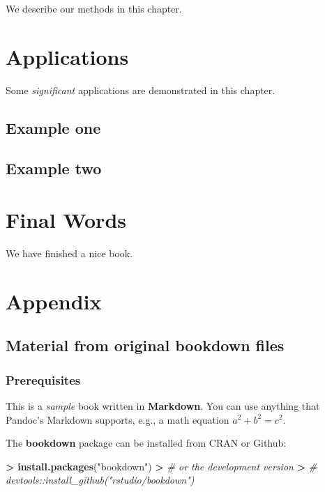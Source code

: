 \documentclass[]{book}
\newenvironment{Shaded}{\begin{snugshade}}{\end{snugshade}}
\newcommand{\KeywordTok}[1]{\textcolor[rgb]{0.13,0.29,0.53}{\textbf{#1}}}
\newcommand{\StringTok}[1]{\textcolor[rgb]{0.31,0.60,0.02}{#1}}
\newcommand{\CommentTok}[1]{\textcolor[rgb]{0.56,0.35,0.01}{\textit{#1}}}
\newcommand{\OperatorTok}[1]{\textcolor[rgb]{0.81,0.36,0.00}{\textbf{#1}}}
\newcommand{\ErrorTok}[1]{\textcolor[rgb]{0.64,0.00,0.00}{\textbf{#1}}}
\newcommand{\NormalTok}[1]{#1}
\theoremstyle{definition}
\theoremstyle{definition}
\theoremstyle{definition}
\theoremstyle{remark}
\begin{document}
We describe our methods in this chapter.

\chapter{Applications}\label{applications}

Some \emph{significant} applications are demonstrated in this chapter.

\section{Example one}\label{example-one}

\section{Example two}\label{example-two}

\chapter{Final Words}\label{final-words}

We have finished a nice book.

\chapter{Appendix}\label{appendix}

\section{Material from original bookdown
files}\label{material-from-original-bookdown-files}

\subsection{Prerequisites}\label{prerequisites}

This is a \emph{sample} book written in \textbf{Markdown}. You can use
anything that Pandoc's Markdown supports, e.g., a math equation
\(a^2 + b^2 = c^2\).

The \textbf{bookdown} package can be installed from CRAN or Github:

\begin{Shaded}
\begin{Highlighting}[]
\OperatorTok{>}\StringTok{ }\KeywordTok{install.packages}\NormalTok{(}\StringTok{"bookdown"}\NormalTok{)}
\OperatorTok{>}\StringTok{ }\CommentTok{# or the development version}
\ErrorTok{>}\StringTok{ }\CommentTok{# devtools::install_github("rstudio/bookdown")}
\end{Highlighting}
\end{Shaded}
\end{document}
